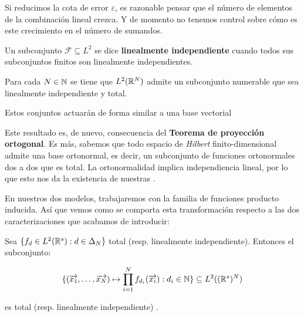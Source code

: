 \begin{observacion}
	Si reducimos la cota de error $\varepsilon$, es razonable pensar que el número de elementos de la combinación lineal crezca. Y de momento no tenemos control sobre cómo es este crecimiento en el número de sumandos.
\end{observacion}

\begin{definicion}

	Un subconjunto $\mathcal{F} \subseteq L^2$ se dice \textbf{linealmente independiente} cuando todos sus subconjuntos finitos son linealmente independientes.

\end{definicion}

\begin{proposicion}
	Para cada $N \in \mathbb{N}$ se tiene que $L^2(\mathbb{R}^N)$ admite un subconjunto numerable que sea linealmente independiente y total.
\end{proposicion}

\begin{observacion}
	Estos conjuntos actuarán de forma similar a una base vectorial
\end{observacion}

\begin{observacion}

	Este resultado es, de nuevo, consecuencia del \textbf{Teorema de proyección ortogonal}. Es más, sabemos que todo espacio de \textit{Hilbert} finito-dimensional admite una base ortonormal, es decir, un subconjunto de funciones ortonormales dos a dos que es total. La ortonormalidad implica independiencia lineal, por lo que esto nos da la existencia de nuestras .

\end{observacion}

En nuestros dos modelos, trabajaremos con la familia de funciones producto inducida. Así que vemos como se comporta esta transformación respecto a las dos caracterizaciones que acabamos de introducir:

\begin{proposicion} \label{prop:conservacion_totalidad_indp_lineal_func_prod}
	Sea $\{ f_d \in L^2(\mathbb{R}^s): d \in \Delta_{N}  \}$ total (resp. linealmente independiente). Entonces el subconjunto:

	\begin{equation}
		\{ (\overrightarrow{x_1}, \ldots, \overrightarrow{x_N}) \mapsto \prod_{i = 1}^N f_{d_i}(\overrightarrow{x_i}): d_i \in \mathbb{N} \} \subseteq L^2((\mathbb{R}^s)^N)
	\end{equation}

	es total (resp. linealmente independiente) \cite{matematicas:descomposicion_ht}.
\end{proposicion}

